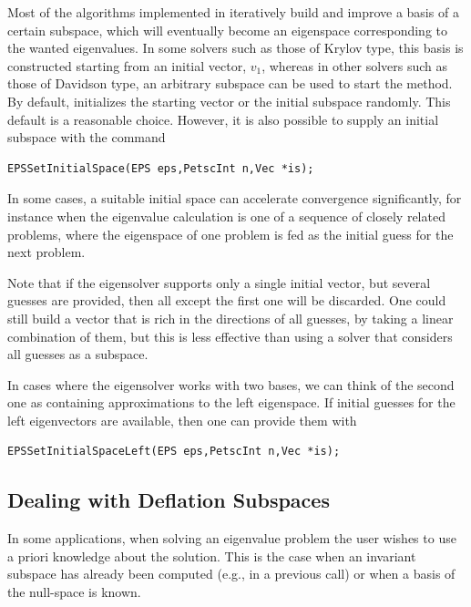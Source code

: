 	Most of the algorithms implemented in  iteratively build and improve a basis of a certain subspace, which will eventually become an eigenspace corresponding to the wanted eigenvalues. In some solvers such as those of Krylov type, this basis is constructed starting from an initial vector, $v_1$, whereas in other solvers such as those of Davidson type, an arbitrary subspace can be used to start the method. By default,  initializes the starting vector or the initial subspace randomly. This default is a reasonable choice. However, it is also possible to supply an initial subspace with the command
	\begin{Verbatim}[fontsize=\small]
	EPSSetInitialSpace(EPS eps,PetscInt n,Vec *is);
	\end{Verbatim}
In some cases, a suitable initial space can accelerate convergence significantly, for instance when the eigenvalue calculation is one of a sequence of closely related problems, where the eigenspace of one problem is fed as the initial guess for the next problem.

Note that if the eigensolver supports only a single initial vector, but several guesses are provided, then all except the first one will be discarded. One could still build a vector that is rich in the directions of all guesses, by taking a linear combination of them, but this is less effective than using a solver that considers all guesses as a subspace.

In cases where the eigensolver works with two bases, we can think of the second one as containing approximations to the left eigenspace. If initial guesses for the left eigenvectors are available, then one can provide them with
	\begin{Verbatim}[fontsize=\small]
	EPSSetInitialSpaceLeft(EPS eps,PetscInt n,Vec *is);
	\end{Verbatim}

\subsection{Dealing with Deflation Subspaces}

	In some applications, when solving an eigenvalue problem the user wishes to use a priori knowledge about the solution. This is the case when an invariant subspace has already been computed (e.g., in a previous  call) or when a basis of the null-space is known.

